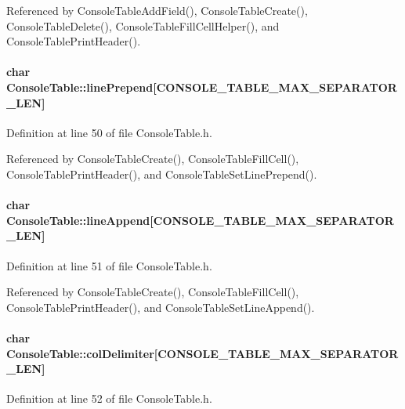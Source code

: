Referenced by ConsoleTableAddField(), ConsoleTableCreate(), ConsoleTableDelete(), ConsoleTableFillCellHelper(), and ConsoleTablePrintHeader().\hypertarget{structConsoleTable_c6553b14348f21dd83635c318d106921}{
\paragraph[linePrepend]{\setlength{\rightskip}{0pt plus 5cm}char {\bf ConsoleTable::linePrepend}\mbox{[}CONSOLE\_\-TABLE\_\-MAX\_\-SEPARATOR\_\-LEN\mbox{]}}\hfill}
\label{structConsoleTable_c6553b14348f21dd83635c318d106921}




Definition at line 50 of file ConsoleTable.h.

Referenced by ConsoleTableCreate(), ConsoleTableFillCell(), ConsoleTablePrintHeader(), and ConsoleTableSetLinePrepend().\hypertarget{structConsoleTable_0332a0e30c5f5d3a21a5710a5c2640b6}{
\paragraph[lineAppend]{\setlength{\rightskip}{0pt plus 5cm}char {\bf ConsoleTable::lineAppend}\mbox{[}CONSOLE\_\-TABLE\_\-MAX\_\-SEPARATOR\_\-LEN\mbox{]}}\hfill}
\label{structConsoleTable_0332a0e30c5f5d3a21a5710a5c2640b6}




Definition at line 51 of file ConsoleTable.h.

Referenced by ConsoleTableCreate(), ConsoleTableFillCell(), ConsoleTablePrintHeader(), and ConsoleTableSetLineAppend().\hypertarget{structConsoleTable_73978b933e863125fe7b27105ca6597a}{
\paragraph[colDelimiter]{\setlength{\rightskip}{0pt plus 5cm}char {\bf ConsoleTable::colDelimiter}\mbox{[}CONSOLE\_\-TABLE\_\-MAX\_\-SEPARATOR\_\-LEN\mbox{]}}\hfill}
\label{structConsoleTable_73978b933e863125fe7b27105ca6597a}




Definition at line 52 of file ConsoleTable.h.

